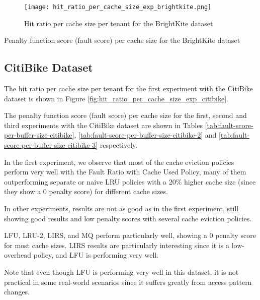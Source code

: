 \newpage

\begin{figure}
    \centering
    \texttt{[image: hit\_ratio\_per\_cache\_size\_exp\_brightkite.png]}
    \caption{Hit ratio per cache size per tenant for the BrightKite dataset}
    \label{fig:hit_ratio_per_cache_size_exp_brightkite}
\end{figure}

\begin{table}[ht]
    \centering
    \small
    \caption{Penalty function score (fault score) per cache size for the BrightKite dataset}
    \label{tab:fault-score-per-buffer-size-brightkite}
\end{table}

\newpage

\subsection{CitiBike Dataset}

The hit ratio per cache size per tenant for the first experiment with the CitiBike dataset is
shown in Figure \ref{fig:hit_ratio_per_cache_size_exp_citibike}.

The penalty function score (fault score) per cache size for the first, second and third 
experiments with the CitiBike dataset are shown in Tables 
\ref{tab:fault-score-per-buffer-size-citibike}, \ref{tab:fault-score-per-buffer-size-citibike-2}
and \ref{tab:fault-score-per-buffer-size-citibike-3} respectively.

In the first experiment, we observe that most of the cache eviction policies perform very 
well with the Fault Ratio with Cache Used Policy, many of them outperforming separate or 
naive LRU  policies with a 20\% higher cache size (since they show a 0 penalty score) for 
different cache sizes.

In other experiments, results are not as good as in the first experiment, still showing
good results and low penalty scores with several cache eviction policies.

LFU, LRU-2, LIRS, and MQ perform particularly well, showing a 0 penalty score for most cache 
sizes. LIRS results are particularly interesting since it is a low-overhead policy, 
and LFU is performing very well. 

Note that even though LFU is performing very well in this dataset, it is not practical in some 
real-world scenarios since it suffers greatly from access pattern changes.


